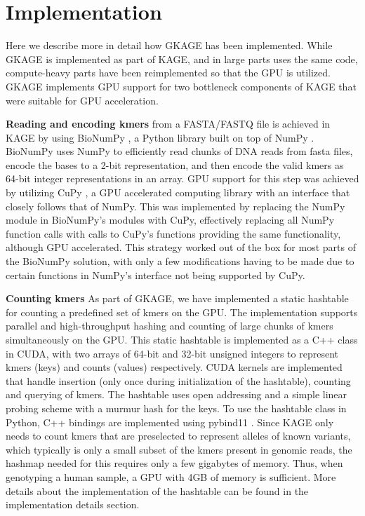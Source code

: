 \section*{Implementation}
Here we describe more in detail how GKAGE has been implemented.
While GKAGE is implemented as part of KAGE, and in large parts uses the same code, compute-heavy parts have been reimplemented so that the GPU is utilized. 
GKAGE implements GPU support for two bottleneck components of KAGE that were suitable for GPU acceleration.

\textbf{Reading and encoding kmers} from a FASTA/FASTQ file is achieved in KAGE by using BioNumPy \cite{bionumpy}, a Python library built on top of NumPy \cite{numpy}.
BioNumPy uses NumPy to efficiently read chunks of DNA reads from fasta files, encode the bases to a 2-bit representation, and then encode the valid kmers as 64-bit integer representations in an array.
GPU support for this step was achieved by utilizing CuPy \cite{cupy}, a GPU accelerated computing library with an interface that closely follows that of NumPy.
This was implemented by replacing the NumPy module in BioNumPy's modules with CuPy, effectively replacing all NumPy function calls with calls to CuPy's functions providing the same functionality, although GPU accelerated.
This strategy worked out of the box for most parts of the BioNumPy solution, with only a few modifications having to be made due to certain functions in NumPy's interface not being supported by CuPy.

\textbf{Counting kmers} As part of GKAGE, we have implemented a static hashtable for counting a predefined set of kmers on the GPU. 
The implementation supports parallel and high-throughput hashing and counting of large chunks of kmers simultaneously on the GPU.
This static hashtable is implemented as a C++ class in CUDA, with two arrays of 64-bit and 32-bit unsigned integers to represent kmers (keys) and counts (values) respectively.
CUDA kernels are implemented that handle insertion (only once during initialization of the hashtable), counting and querying of kmers.
The hashtable uses open addressing and a simple linear probing scheme with a murmur hash for the keys.
To use the hashtable class in Python, C++ bindings are implemented using pybind11 \cite{pybind11}.
Since KAGE only needs to count kmers that are preselected to represent alleles of known variants, which typically is only a small subset of the kmers present in genomic reads, the hashmap needed for this requires only a few gigabytes of memory.
Thus, when genotyping a human sample, a GPU with 4GB of memory is sufficient.
More details about the implementation of the hashtable can be found in the implementation details section.

